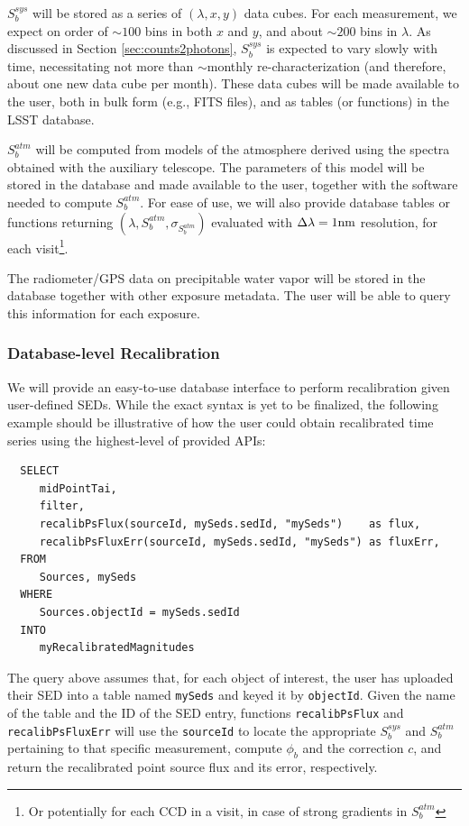 \documentclass[12pt,preprint]{aastex}
\begin{document}
$S_b^{sys}$ will be stored as a series of $(\lambda, x, y)$ data cubes. For each measurement, we expect on order of $\sim 100$ bins in both $x$ and $y$, and about $\sim 200$ bins in $\lambda$. As discussed in Section \ref{sec:counts2photons}, $S_b^{sys}$ is expected to vary slowly with time, necessitating not more than $\sim$monthly re-characterization (and therefore, about one new data cube per month). These data cubes will be made available to the user, both in bulk form (e.g., FITS files), and as tables (or functions) in the LSST database.

$S_b^{atm}$ will be computed from models of the atmosphere derived using the spectra obtained with the auxiliary telescope. The parameters of this model will be stored in the database and made available to the user, together with the software needed to compute $S_b^{atm}$. For ease of use, we will also provide database tables or functions returning $(\lambda, S_b^{atm}, \sigma_{S_b^{atm}})$ evaluated with $\Delta\lambda = 1 {\rm nm}$ resolution, for each visit\footnote{Or potentially for each CCD in a visit, in case of strong gradients in $S_b^{atm}$}.

The radiometer/GPS data on precipitable water vapor will be stored in the database together with other exposure metadata. The user will be able to query this information for each exposure.

\subsubsection{Database-level Recalibration}

We will provide an easy-to-use database interface to perform recalibration given user-defined SEDs. While the exact syntax is yet to be finalized, the following example should be illustrative of how the user could obtain recalibrated time series using the highest-level of provided APIs:
%
\begin{verbatim}
  SELECT
     midPointTai,
     filter,
     recalibPsFlux(sourceId, mySeds.sedId, "mySeds")    as flux,
     recalibPsFluxErr(sourceId, mySeds.sedId, "mySeds") as fluxErr,
  FROM
     Sources, mySeds
  WHERE
     Sources.objectId = mySeds.sedId
  INTO
     myRecalibratedMagnitudes
\end{verbatim}
%
The query above assumes that, for each object of interest, the user has uploaded their SED into a table named {\tt mySeds} and keyed it by {\tt objectId}. Given the name of the table and the ID of the SED entry, functions {\tt recalibPsFlux} and {\tt recalibPsFluxErr} will use the {\tt sourceId} to locate the appropriate $S_b^{sys}$ and $S_b^{atm}$ pertaining to that specific measurement, compute $\phi_b$ and the correction $c$, and return the recalibrated point source flux and its error, respectively.
\end{document}
